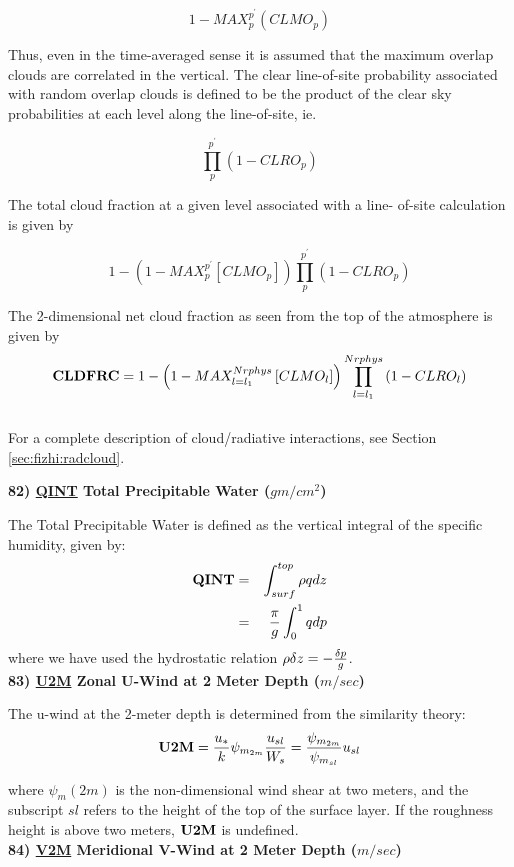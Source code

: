 $$1-MAX_p^{p^{\prime}} \left( CLMO_p \right)$$

Thus, even in the time-averaged sense it is assumed that the
maximum overlap clouds are correlated in the vertical.  The clear
line-of-site probability associated with random overlap clouds is
defined to be the product of the clear sky probabilities at each
level along the line-of-site, ie. 

$$\prod_{p}^{p^{\prime}} \left( 1-CLRO_p \right)$$

The total cloud fraction at a given level associated with a line-
of-site calculation is given by

$$1-\left( 1-MAX_p^{p^{\prime}} \left[ CLMO_p \right] \right)
    \prod_p^{p^{\prime}} \left( 1-CLRO_p \right)$$


\noindent
The 2-dimensional net cloud fraction as seen from the top of the
atmosphere is given by
\[
{\bf CLDFRC} = 1-\left( 1-MAX_{l=l_1}^{Nrphys} \left[ CLMO_l \right] \right)
    \prod_{l=l_1}^{Nrphys} \left( 1-CLRO_l \right)
\]
\\
For a complete description of cloud/radiative interactions, see Section \ref{sec:fizhi:radcloud}.


\noindent
{\bf 82)  \underline {QINT} Total Precipitable Water ($gm/cm^2$) }

\noindent
The Total Precipitable Water is defined as the vertical integral of the specific humidity,
given by:
\begin{eqnarray*}
{\bf QINT} & = & \int_{surf}^{top} \rho q dz \\
           & = & {\pi \over g} \int_0^1 q dp
\end{eqnarray*}
where we have used the hydrostatic relation 
$\rho \delta z = -{\delta p \over g} $.
\\


\noindent
{\bf 83)  \underline {U2M}  Zonal U-Wind at 2 Meter Depth ($m/sec$) }

\noindent
The u-wind at the 2-meter depth is determined from the similarity theory:
\[
{\bf U2M} = {u_* \over k} \psi_{m_{2m}} {u_{sl} \over {W_s}} =
{ \psi_{m_{2m}} \over {\psi_{m_{sl}} }}u_{sl}
\]

\noindent
where $\psi_m(2m)$ is the non-dimensional wind shear at two meters, and the subscript
$sl$ refers to the height of the top of the surface layer. If the roughness height
is above two meters, ${\bf U2M}$ is undefined.
\\
 
\noindent
{\bf 84)  \underline {V2M}  Meridional V-Wind at 2 Meter Depth ($m/sec$) }

